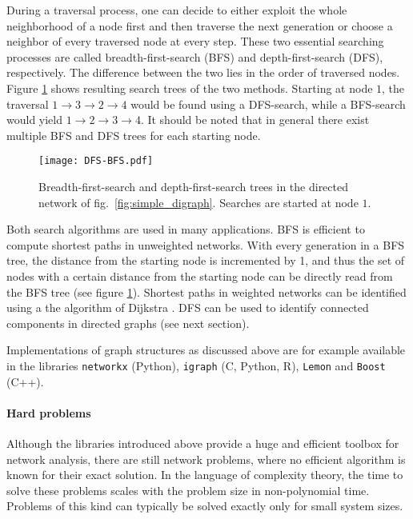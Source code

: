 \documentclass[openright,twoside,headsepline]{scrbook}
\begin{document}
During a traversal process, one can decide to either exploit the whole neighborhood of a node first and then traverse the next generation or choose a neighbor of every traversed node at every step.
These two essential searching processes are called breadth-first-search (BFS) and depth-first-search (DFS), respectively.
The difference between the two lies in the order of traversed nodes.
Figure \ref{fig:dfs_bfs} shows resulting search trees of the two methods.
Starting at node $1$, the traversal $1\rightarrow 3 \rightarrow 2 \rightarrow 4$ would be found using a DFS-search, while a BFS-search would yield $1\rightarrow 2 \rightarrow 3 \rightarrow 4$.
It should be noted that in general there exist multiple BFS and DFS trees for each starting node. 
%
\begin{figure}[htbp]
\begin{center}
\texttt{[image: DFS-BFS.pdf]}
\caption{Breadth-first-search and depth-first-search trees in the directed network of fig.~\ref{fig:simple_digraph}. Searches are started at node $1$.}
\label{fig:dfs_bfs}
\end{center}
\end{figure}

Both search algorithms are used in many applications.
BFS is efficient to compute shortest paths in unweighted networks.
With every generation in a BFS tree, the distance from the starting node is incremented by 1, and thus the set of nodes with a certain distance from the starting node can be directly read from the BFS tree (see figure \ref{fig:dfs_bfs}).
Shortest paths in weighted networks can be identified using a the algorithm of Dijkstra \citep{Dijkstra:1959}.
DFS can be used to identify connected components in directed graphs (see next section).

Implementations of graph structures as discussed above are for example available in the libraries \verb"networkx" (Python), \verb"igraph" (C, Python, R), \verb"Lemon" and \verb"Boost" (C++).

\paragraph{Hard problems\color{Cayenne}{.}}
Although the libraries introduced above provide a huge and efficient toolbox for network analysis, there are still network problems, where no efficient algorithm is known for their exact solution.
In the language of complexity theory, the time to solve these problems scales with the problem size in non-polynomial time.
Problems of this kind can typically be solved exactly only for small system sizes.
\end{document}
